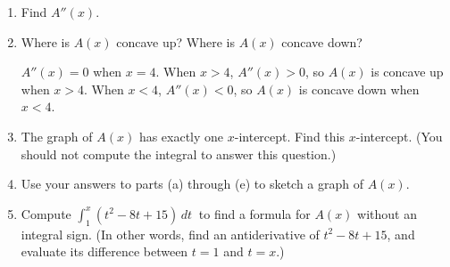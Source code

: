\documentclass{article}
\begin{document}
\begin{enumerate}
\begin{enumerate}
        \begin{solution}
         $A(x)$ increases when $A'(x)$ is positive, and  $A(x)$ decreases when $A'(x)$ is negative. Let's see where $A'(x)=0$:
         \begin{align*}
             A'(x)&=0\\
             x^2-8x+15&=0\\
             (x-3)(x-5)&=0\\
         \end{align*}
         Thus, $A'(x)=0$ when $x=3$ and $x=5$. When $x<3$ and $x>5$, $A'(x)>0$, so $A(x)$ increases on $(-\infty, 3)\cup(5, \infty)$. When $3<x<5$, $A'(x)<0$, so $A(x)$ decreases on $(3, 5)$.
        \end{solution}
        \vfill \vfill
        \item Find $A''(x)$.
        \solonly{\textcolor{red}{$A''(x)=2x-8$}}
        \vfill
        \item Where is $A(x)$ concave up? Where is $A(x)$ concave down?
        
        \begin{solution}
            $A''(x)=0$ when $x=4$. When $x>4$, $A''(x)>0$, so $A(x)$ is concave up when $x>4$. When $x<4$, $A''(x)<0$, so $A(x)$ is concave down when $x<4$.
        \end{solution}
        \vfill \vfill
        \newpage
        \begin{center}
    \end{center}
        \item The graph of $A(x)$ has exactly one $x$-intercept. Find this $x$-intercept. (You should not compute the integral to answer this question.) 
        \solonly{\textcolor{red}{$x=1$}}\vfill 
        \item Use your answers to parts (a) through (e) to sketch a graph of $A(x)$.
        \vfill \vfill\vfill 
        \item Compute $\displaystyle \int_{1}^{x} (t^2-8t+15)\,dt\ $ to find a formula for $A(x)$ without an integral sign. (In other words, find an antiderivative of $t^2-8t+15$, and evaluate its difference between $t=1$ and $t=x$.)
        

\end{enumerate}
\end{enumerate}
\end{document}
